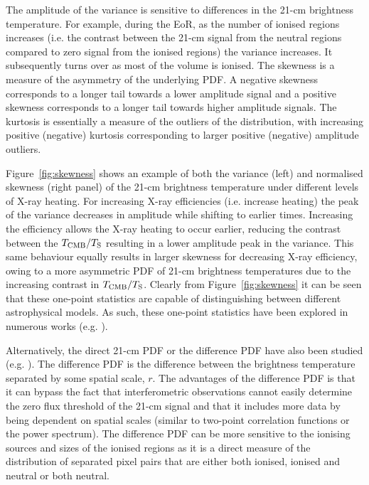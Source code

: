 The amplitude of the variance is sensitive to differences in the 21-cm brightness temperature. For example, during the EoR, as the number of ionised regions increases (i.e. the contrast between the 21-cm signal from the neutral regions compared to zero signal from the ionised regions) the variance increases. It subsequently turns over as most of the volume is ionised. The skewness is a measure of the asymmetry of the underlying PDF. A negative skewness corresponds to a longer tail towards a lower amplitude signal and a positive skewness corresponds to a longer tail towards higher amplitude signals. The kurtosis is essentially a measure of the outliers of the distribution, with increasing positive (negative) kurtosis corresponding to larger positive (negative) amplitude outliers.

Figure~\ref{fig:skewness} shows an example of both the variance (left) and normalised skewness (right panel) of the 21-cm brightness temperature under different levels of X-ray heating. For increasing X-ray efficiencies (i.e. increase heating) the peak of the variance decreases in amplitude while shifting to earlier times. Increasing the efficiency allows the X-ray heating to occur earlier, reducing the contrast between the $T_{\rm CMB}/T_{\rm S}$ resulting in a lower amplitude peak in the variance. This same behaviour equally results in larger skewness for decreasing X-ray efficiency, owing to a more asymmetric PDF of 21-cm brightness temperatures due to the increasing contrast in $T_{\rm CMB}/T_{\rm S}$. Clearly from Figure~\ref{fig:skewness} it can be seen that these one-point statistics are capable of distinguishing between different astrophysical models. As such, these one-point statistics have been explored in numerous works (e.g. \cite{Wyithe:2007b,Harker:2009,Patil:2014,Watkinson:2014,Watkinson:2015,Kittiwisit:2016,Kubota:2016,Watkinson:2015b,Shimabukuro:2015,Ross:2017}).

Alternatively, the direct 21-cm PDF or the difference PDF have also been studied (e.g. \cite{Barkana:2008,Gluscevic:2010,Ichikawa:2010,Pan:2012}). The difference PDF is the difference between the brightness temperature separated by some spatial scale, $r$. The advantages of the difference PDF is that it can bypass the fact that interferometric observations cannot easily determine the zero flux threshold of the 21-cm signal and that it includes more data by being dependent on spatial scales (similar to two-point correlation functions or the power spectrum). The difference PDF can be more sensitive to the ionising sources and sizes of the ionised regions as it is a direct measure of the distribution of separated pixel pairs that are either both ionised, ionised and neutral or both neutral.

